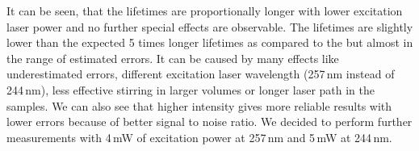 It can be seen, that the lifetimes are proportionally longer with lower
excitation laser power and no further special effects are observable. The
lifetimes are slightly lower than the expected 5 times longer lifetimes as
compared to the  but almost in the
range of estimated errors. It can be caused by many effects like underestimated
errors, different excitation laser wavelength (257\,nm instead of 244\,nm),
less effective stirring in larger volumes or longer laser path in the samples.
We can also see that higher intensity gives more reliable results with
lower errors because of better signal to noise ratio. We decided to perform
further measurements with 4\,mW of excitation power at 257\,nm and 5\,mW at
244\,nm.
